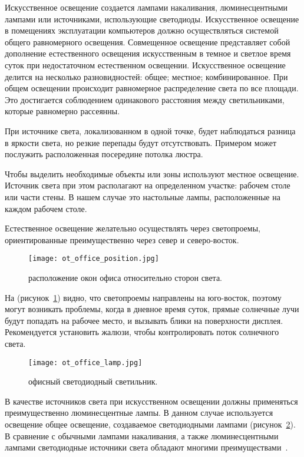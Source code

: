 Искусственное освещение создается лампами накаливания, люминесцентными лампами или источниками, использующие светодиоды.
Искусственное освещение в помещениях эксплуатации компьютеров должно осуществляться системой общего равномерного освещения.
Совмещенное освещение представляет собой дополнение естественного освещения искусственным в темное и светлое время суток при недостаточном естественном освещении.
Искусственное освещение делится на несколько разновидностей: общее; местное; комбинированное.
При общем освещении происходит равномерное распределение света по все площади.
Это достигается соблюдением одинакового расстояния между светильниками, которые равномерно рассеянны.

При источнике света, локализованном в одной точке, будет наблюдаться разница в яркости света, но резкие перепады будут отсутствовать.
Примером может послужить расположенная посередине потолка люстра.

Чтобы выделить необходимые объекты или зоны используют местное освещение.
Источник света при этом располагают на определенном участке: рабочем столе или части стены.
В нашем случае это настольные лампы, расположенные на каждом рабочем столе.

Естественное освещение желательно осуществлять через светопроемы, ориентированные преимущественно через север и северо-восток.

\begin{figure}[ht]
\centering
  \texttt{[image: ot\_office\_position.jpg]}
  \caption{ расположение окон офиса относительно сторон света. }
  \label{fig:office_position}
\end{figure}

На (рисунок~\ref{fig:office_position}) видно, что светопроемы направлены на юго-восток, поэтому могут возникать проблемы, когда в дневное время суток, прямые солнечные лучи будут попадать на рабочее место, и вызывать блики на поверхности дисплея.
Рекомендуется установить жалюзи, чтобы контролировать поток солнечного света.

\begin{figure}[ht]
\centering
  \texttt{[image: ot\_office\_lamp.jpg]}
  \caption{ офисный светодиодный светильник. }
  \label{fig:office_lamp}
\end{figure}

В качестве источников света при искусственном освещении должны применяться преимущественно люминесцентные лампы.
В данном случае используется освещение общее освещение, создаваемое светодиодными лампами (рисунок~\ref{fig:office_lamp}).
В сравнение с обычными лампами накаливания, а также люминесцентными лампами светодиодные источники света обладают многими преимуществами~\cite{ot_diod_lamp}.

